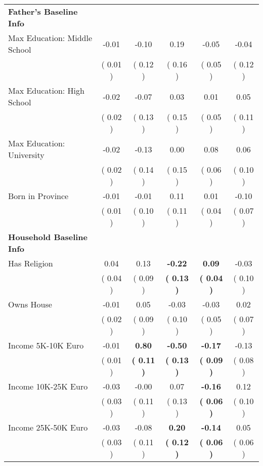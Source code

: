 \begin{table}[H]
{\begin{tabular}{lccccc}
\midrule
\textbf{Father's Baseline Info} \\
\quad Max Education: Middle School &     -0.01 &     -0.10 &      0.19 &     -0.05 &     -0.04 \\
\quad  & (     0.01 ) & (     0.12 )  & (     0.16 )  & (     0.05 ) & (     0.12 ) \\
\quad Max Education: High School &     -0.02 &     -0.07 &      0.03 &      0.01 &      0.05 \\
\quad  & (     0.02 ) & (     0.13 )  & (     0.15 )  & (     0.05 ) & (     0.11 ) \\
\quad Max Education: University &     -0.02 &     -0.13 &      0.00 &      0.08 &      0.06 \\
\quad  & (     0.02 ) & (     0.14 )  & (     0.15 )  & (     0.06 ) & (     0.10 ) \\
\quad Born in Province &     -0.01 &     -0.01 &      0.11 &      0.01 &     -0.10 \\
\quad  & (     0.01 ) & (     0.10 )  & (     0.11 )  & (     0.04 ) & (     0.07 ) \\
\midrule
\textbf{Household Baseline Info} \\
\quad Has Religion &      0.04 &      0.13 & \textbf{    -0.22} & \textbf{     0.09} &     -0.03 \\
\quad  & (     0.04 ) & (     0.09 )  & \textbf{(     0.13 )}  & \textbf{(     0.04 )} & (     0.10 ) \\
\quad Owns House &     -0.01 &      0.05 &     -0.03 &     -0.03 &      0.02 \\
\quad  & (     0.02 ) & (     0.09 )  & (     0.10 )  & (     0.05 ) & (     0.07 ) \\
\quad Income 5K-10K Euro &     -0.01 & \textbf{     0.80} & \textbf{    -0.50} & \textbf{    -0.17} &     -0.13 \\
\quad  & (     0.01 ) & \textbf{(     0.11 )}  & \textbf{(     0.13 )}  & \textbf{(     0.09 )} & (     0.08 ) \\
\quad Income 10K-25K Euro &     -0.03 &     -0.00 &      0.07 & \textbf{    -0.16} &      0.12 \\
\quad  & (     0.03 ) & (     0.11 )  & (     0.13 )  & \textbf{(     0.06 )} & (     0.10 ) \\
\quad Income 25K-50K Euro &     -0.03 &     -0.08 & \textbf{     0.20} & \textbf{    -0.14} &      0.05 \\
\quad  & (     0.03 ) & (     0.11 )  & \textbf{(     0.12 )}  & \textbf{(     0.06 )} & (     0.06 ) \\

\end{tabular}}
\end{table}
